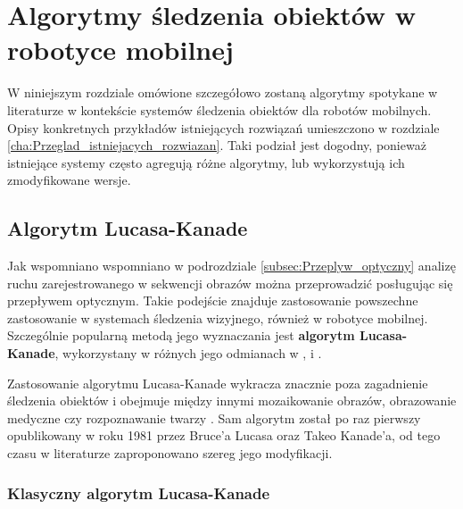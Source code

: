 \chapter{Algorytmy śledzenia obiektów w robotyce mobilnej}
\label{cha:Algorymty_sledzenia_obiektow_w_robotyce_mobilnej}


W niniejszym rozdziale omówione szczegółowo zostaną algorytmy spotykane w literaturze w kontekście systemów śledzenia obiektów dla robotów mobilnych. Opisy konkretnych przykładów istniejących rozwiązań umieszczono w rozdziale \ref{cha:Przeglad_istniejacych_rozwiazan}. Taki podział jest dogodny, ponieważ  istniejące systemy często agregują różne algorytmy, lub wykorzystują ich zmodyfikowane wersje.

\section{Algorytm Lucasa-Kanade}
\label{sec:Algorytm_Lucasa_Kanade}
Jak wspomniano wspomniano w podrozdziale \ref{subsec:Przeplyw_optyczny} analizę ruchu zarejestrowanego w sekwencji obrazów można przeprowadzić posługując się przepływem optycznym. Takie podejście znajduje zastosowanie powszechne zastosowanie w systemach śledzenia wizyjnego, również w robotyce mobilnej. Szczególnie popularną metodą jego wyznaczania jest \textbf{algorytm Lucasa-Kanade}, wykorzystany w różnych jego odmianach w \cite{Liem2008}, \cite{Markovic2014} i \cite{Olivares-Mendez2009}.

Zastosowanie algorytmu Lucasa-Kanade wykracza znacznie poza zagadnienie śledzenia obiektów i obejmuje między innymi mozaikowanie obrazów, obrazowanie medyczne czy rozpoznawanie twarzy \cite{Baker2004}. Sam algorytm został po raz pierwszy opublikowany w roku 1981 przez Bruce'a Lucasa oraz Takeo Kanade'a, od tego czasu w literaturze zaproponowano szereg jego modyfikacji.

\subsection{Klasyczny algorytm Lucasa-Kanade}
\label{subsec:Klasyczny_algorytm_Lucasa_Kanade}

